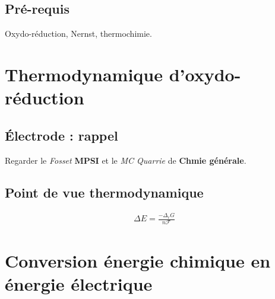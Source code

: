 %
%
%
%	
%	
%	
%	
	
	
\subsection{Pré-requis}
Oxydo-réduction, Nernst, thermochimie.

\section{Thermodynamique d'oxydo-réduction}

 \subsection{Électrode : rappel}
 Regarder le \textit{Fosset} \textbf{MPSI} et le \textit{MC Quarrie} de \textbf{Chmie générale}.
 
 \subsection{Point de vue thermodynamique}
 \begin{eqnarray}
 \Delta E = \frac{-\Delta_rG}{n\mathcal{F}}
 \end{eqnarray}
\section{Conversion énergie chimique en énergie électrique}

